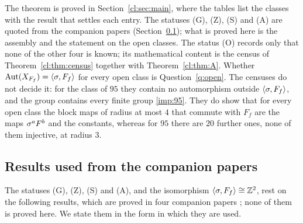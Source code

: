 The theorem is proved in Section~\ref{cl:sec:main}, where the tables list the classes with the result that settles each entry. The statuses (G), (Z), (S) and (A) are quoted from the companion papers \cite{PaperA,PaperB,PaperC,PaperE} (Section~\ref{sec:imported}); what is proved here is the assembly and the statement on the open classes. The status (O) records only that none of the other four is known; its mathematical content is the census of Theorem~\ref{cl:thm:census} together with Theorem~\ref{cl:thm:A}. Whether $\operatorname{Aut}(X_{F_f})=\langle\sigma,F_f\rangle$ for every open class is Question~\ref{q:open}. The censuses do not decide it: for the class of $95$ they contain no automorphism outside $\langle\sigma,F_f\rangle$, and the group contains every finite group \eqref{imp:95}. They do show that for every open class the block maps of radius at most $4$ that commute with $F_f$ are the maps $\sigma^aF^b$ and the constants, whereas for $95$ there are $20$ further ones, none of them injective, at radius $3$.

\subsection{Results used from the companion papers}\label{sec:imported}

The statuses (G), (Z), (S) and (A), and the isomorphism $\langle\sigma,F_f\rangle\cong\mathbb{Z}^2$, rest on the following results, which are proved in four companion papers \cite{PaperA,PaperB,PaperC,PaperE}; none of them is proved here. We state them in the form in which they are used.

